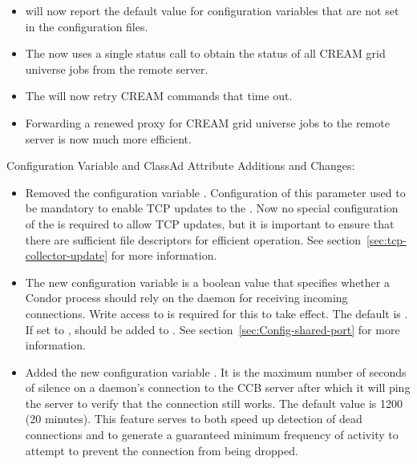 \begin{itemize}
\item {} will now report the default value for
  configuration variables that are not set in the configuration files.

\item The  now uses a single status call to obtain
the status of all CREAM grid universe jobs from the remote server.

\item The  will now retry CREAM commands that time out.

\item Forwarding a renewed proxy for CREAM grid universe jobs to the
remote server is now much more efficient.

\end{itemize}

\noindent Configuration Variable and ClassAd Attribute Additions and Changes:

\begin{itemize}

\item Removed the configuration variable 
  .
  Configuration of this parameter used to be mandatory to enable TCP updates
  to the .  Now no special configuration of the
   is required to allow TCP updates, but it is
  important to ensure that there are sufficient file descriptors for
  efficient operation.  See section~\ref{sec:tcp-collector-update} for
  more information.

\item The new configuration variable  
  is a boolean value that specifies
  whether a Condor process should rely on the  daemon for
  receiving incoming connections.  Write access to
   is required for this to take effect.
  The default is .  If set to , 
  should be added to .  See
  section~\ref{sec:Config-shared-port} for more information.

\item Added the new configuration variable .
  It is the maximum
  number of seconds of silence on a daemon's connection to the CCB server
  after which it will ping the server to verify that the connection still
  works.  
  The default value is 1200 (20 minutes).
  This feature serves to both speed
  up detection of dead connections and to generate a guaranteed minimum
  frequency of activity to attempt to prevent the connection from being
  dropped.

\end{itemize}

